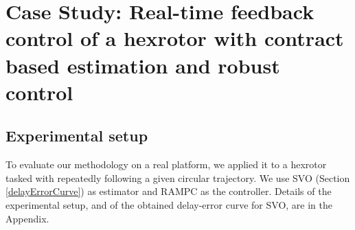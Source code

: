 \section{Case Study: Real-time feedback control of a hexrotor with contract based estimation and robust control}
\label{sec:experiments}

\subsection{Experimental setup}
To evaluate our methodology on a real platform, we applied it to a hexrotor tasked with repeatedly following a given circular trajectory.
We use SVO (Section \ref{delayErrorCurve}) as estimator and RAMPC as the controller.
Details of the experimental setup, and of the obtained delay-error curve for SVO, are in the Appendix.




